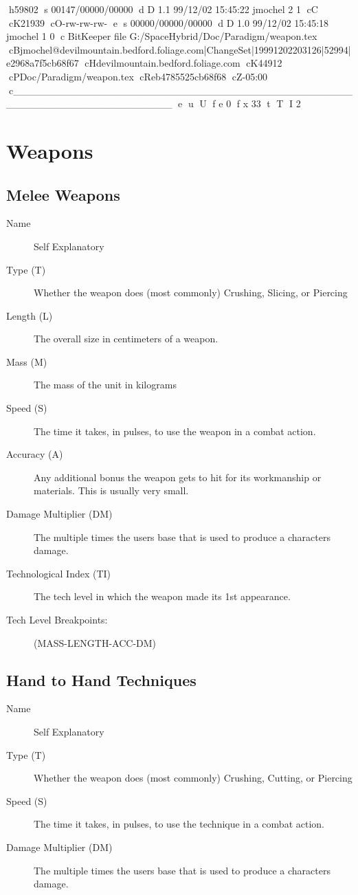 h59802
s 00147/00000/00000
d D 1.1 99/12/02 15:45:22 jmochel 2 1
cC
cK21939
cO-rw-rw-rw-
e
s 00000/00000/00000
d D 1.0 99/12/02 15:45:18 jmochel 1 0
c BitKeeper file G:/SpaceHybrid/Doc/Paradigm/weapon.tex
cBjmochel@devilmountain.bedford.foliage.com|ChangeSet|19991202203126|52994|e2968a7f5cb68f67
cHdevilmountain.bedford.foliage.com
cK44912
cPDoc/Paradigm/weapon.tex
cReb4785525cb68f68
cZ-05:00
c______________________________________________________________________
e
u
U
f e 0
f x 33
t
T
I 2
\chapter{Weapons}

\section{Melee Weapons}

\begin{description}
	\item[Name]
	Self Explanatory
	\item[Type (T)]
	Whether the weapon does (most commonly) Crushing, Slicing, or Piercing
	\item[Length (L)]
	The overall size in centimeters of a weapon.
	\item[Mass (M)]
	The mass of the unit in kilograms
	\item[Speed (S)]
	The time it takes, in pulses, to use the weapon in a combat action.
	\item[Accuracy (A)]
	Any additional bonus the weapon gets to hit for its workmanship or
	materials. This is usually very small.
	\item[Damage Multiplier (DM)]
	The multiple times the users base that is used to produce a characters
	damage.
	\item[Technological Index (TI)]
	The tech level in which the weapon made its 1st appearance.
	\item[Tech Level Breakpoints:]
	(MASS-LENGTH-ACC-DM)
\end{description}

\clearpage
\section{Hand to Hand Techniques}

\begin{description}
	\item[Name]
	Self Explanatory
	\item[Type (T)]
	Whether the weapon does (most commonly) Crushing, Cutting, or Piercing
	\item[Speed (S)]
	The time it takes, in pulses, to use the technique in a combat action.
	\item[Damage Multiplier (DM)]
	The multiple times the users base that is used to produce a characters
	damage.
\end{description}

